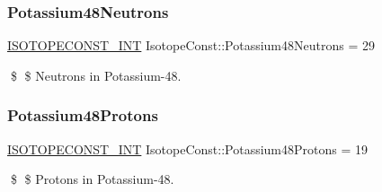 \subsubsection{\texorpdfstring{Potassium48\+Neutrons}{Potassium48Neutrons}}
{\footnotesize\ttfamily \mbox{\hyperlink{group___isotope_const-_macros_ga5f18360b3e99483a35c32d789e62621c}{I\+S\+O\+T\+O\+P\+E\+C\+O\+N\+S\+T\+\_\+\+I\+NT}} Isotope\+Const\+::\+Potassium48\+Neutrons = 29}

\$ \$ Neutrons in Potassium-\/48. \mbox{\label{group___isotope_const-_potassium-_k48_ga8dc005cc8a265d833ec2068e723ffda8}} 
\subsubsection{\texorpdfstring{Potassium48\+Protons}{Potassium48Protons}}
{\footnotesize\ttfamily \mbox{\hyperlink{group___isotope_const-_macros_ga5f18360b3e99483a35c32d789e62621c}{I\+S\+O\+T\+O\+P\+E\+C\+O\+N\+S\+T\+\_\+\+I\+NT}} Isotope\+Const\+::\+Potassium48\+Protons = 19}

\$ \$ Protons in Potassium-\/48. 